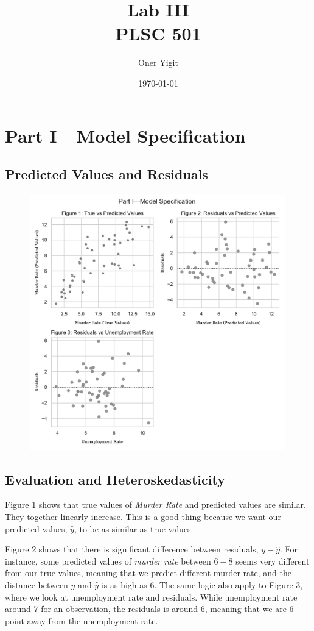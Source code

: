 \documentclass[12pt]{article}
\title{Lab III\\\normalsize{PLSC 501}}
\author{Oner Yigit}
\date{\today}
\begin{document}
\maketitle

\section{Part I—Model Specification}
\subsection{Predicted Values and Residuals}
\begin{figure}[H]
\centering
\includegraphics[width=0.99\textwidth]{figure123.pdf}
\end{figure}

\subsection{Evaluation and Heteroskedasticity}

Figure 1 shows that true values of \textit{Murder Rate} and predicted values are similar. They together linearly increase. This is a good thing because we want our predicted values, $\hat{y}$, to be as similar as true values.

Figure 2 shows that there is significant difference between residuals, $y- \hat{y}$. For instance, some predicted values of \textit{murder rate} between $6-8$ seems very different from our true values, meaning that we predict different murder rate, and the distance between $y$ and $\hat{y}$ is as high as $6$. The same logic also apply to Figure 3, where we look at unemployment rate and residuals. While unemployment rate around 7 for an observation, the residuals is around 6, meaning that we are 6 point away from the unemployment rate. 
\end{document}
